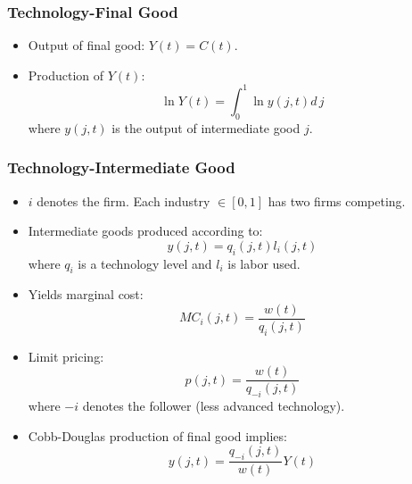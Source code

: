 \documentclass{beamer}
\begin{document}
\begin{frame}[t]\frametitle{Technology-Final Good} 
  \begin{itemize}
    \item<+-> Output of final good: $Y(t) = C(t)$.
    
    \item<+-> Production of $Y(t)$:
      \begin{equation} \label{eq:tech_output}
        \ln Y(t) = \int_{0}^{1} \ln y(j, t) d\,j 
      \end{equation}
      where $y(j, t)$ is the output of intermediate good $j$.
    
  \end{itemize}
\end{frame}

\begin{frame}[t]\frametitle{Technology-Intermediate Good} 
  \begin{itemize}
    \item<+-> $i$ denotes the firm.  Each industry $\in [0, 1]$ has two firms competing.

    \item<+-> Intermediate goods produced according to:
      \begin{equation*} \label{eq:intermediate_production}
        y(j, t) = q_i(j, t)l_i(j, t)
      \end{equation*}
      where $q_i$ is a technology level and $l_i$ is labor used. 

    \item<+-> Yields marginal cost:
      \begin{equation*} \label{eq:marginal_cost}
        MC_i(j, t) = \frac{w(t)}{q_i(j, t)}
      \end{equation*}

    \item<+-> Limit pricing:
      \begin{equation*} \label{eq:limit_pricing}
        p(j, t) = \frac{w(t)}{q_{-i}(j, t)}      
      \end{equation*}
    where $-i$ denotes the follower (less advanced technology).
    \item<+-> Cobb-Douglas production of final good implies:
      \begin{equation}
        y(j, t) = \frac{q_{-i}(j, t)}{w(t)}Y(t)
      \end{equation}
  \end{itemize}
\end{frame}
\end{document}
